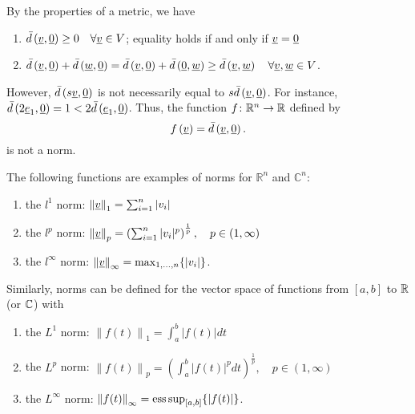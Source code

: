 \begin{example}
By the properties of a metric, we have
\begin{enumerate}
\item $\bar{d} \left( \underline{v}, \underline{0} \right) \geq 0 \quad \forall \underline{v} \in V$; equality holds if and only if $\underline{v} = \underline{0}$
\item $\bar{d} \left( \underline{v}, \underline{0} \right) + \bar{d} \left( \underline{w}, \underline{0} \right) = \bar{d} \left( \underline{v}, \underline{0} \right) + \bar{d} \left( \underline{0}, \underline{w} \right) \geq \bar{d} \left( \underline{v}, \underline{w} \right) \quad \forall \underline{v}, \underline{w} \in V$.
\end{enumerate}
However, $\bar{d} \left( s \underline{v}, \underline{0} \right)$ is not necessarily equal to $s \bar{d} \left( \underline{v}, \underline{0} \right)$.
For instance,
$\bar{d} \left( 2 \underline{e}_1, \underline{0} \right) = 1 < 2 \bar{d} \left( \underline{e}_1, \underline{0} \right)$.
Thus, the function $f \colon \mathbb{R}^n \rightarrow \mathbb{R}$ defined by
\begin{equation*}
f \left( \underline{v} \right) = \bar{d} \left( \underline{v}, \underline{0} \right).
\end{equation*}
is not a norm.
\end{example}

\begin{example}
The following functions are examples of norms for $\mathbb{R}^n$ and $\mathbb{C}^n$:
\begin{enumerate}
\item the $l^1$ norm: $\left\| \underline{v} \right\|_1 = \sum_{i=1}^n |v_i|$
\item the $l^p$ norm: $\left\| \underline{v} \right\|_p = \left( \sum_{i=1}^n |v_i|^p \right)^{\frac{1}{p}}, \quad p \in (1,\infty)$
\item the $l^{\infty}$ norm: $\left\| \underline{v} \right\|_{\infty} = \max_{1,\ldots, n} \{ |v_i| \}$.
\end{enumerate}
\end{example}

\begin{example}
Similarly, norms can be defined for the vector space of functions from $[a, b]$ to $\mathbb{R}$ (or $\mathbb{C}$) with
\begin{enumerate}
\item the $L^1$ norm: $\left\| f(t) \right\|_1 = \int_a^b |f(t)| dt$
\item the $L^p$ norm: $\left\| f(t) \right\|_p = \left( \int_a^b |f(t)|^p dt \right)^{\frac{1}{p}}, \quad p \in (1,\infty)$
\item the $L^{\infty}$ norm: $\left\| f(t) \right\|_{\infty} = \operatorname*{ess\,sup}_{[a,b]} \{ | f(t) | \}$.
\end{enumerate}
\end{example}

